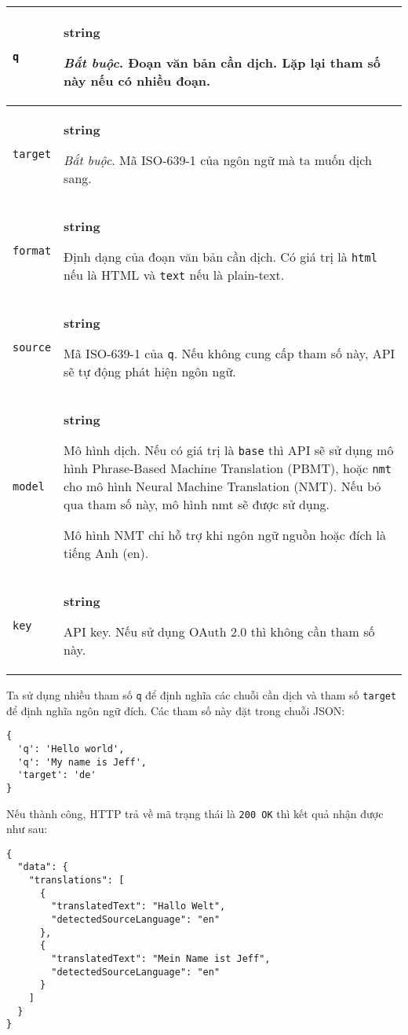 \documentclass[../thesis.tex]{subfiles}
\begin{document}
\begin{center}
\begin{tabularx}{\textwidth}{|p{}|X|}
\hline
\lstinline{q} & \textbf{string}

\textit{Bắt buộc}. Đoạn văn bản cần dịch. Lặp lại tham số này nếu có nhiều đoạn.\\
\hline
\lstinline{target} & \textbf{string}

\textit{Bắt buộc}. Mã ISO-639-1 của ngôn ngữ mà ta muốn dịch sang.\\
\hline
\lstinline{format} & \textbf{string}

Định dạng của đoạn văn bản cần dịch. Có giá trị là \lstinline{html} nếu là HTML và \lstinline{text} nếu là plain-text.\\
\hline
\lstinline{source} & \textbf{string}

Mã ISO-639-1 của \lstinline{q}. Nếu không cung cấp tham số này, API sẽ tự động phát hiện ngôn ngữ.\\
\hline
\lstinline{model} & \textbf{string}

Mô hình dịch. Nếu có giá trị là \lstinline{base} thì API sẽ sử dụng mô hình Phrase-Based Machine Translation (PBMT), hoặc \lstinline{nmt} cho mô hình Neural Machine Translation (NMT). Nếu bỏ qua tham số này, mô hình nmt sẽ được sử dụng.

Mô hình NMT chỉ hỗ trợ khi ngôn ngữ nguồn hoặc đích là tiếng Anh (en).\\
\hline
\lstinline{key} & \textbf{string}

API key. Nếu sử dụng OAuth 2.0 thì không cần tham số này.\\
\hline
\end{tabularx}
\end{center}

Ta sử dụng nhiều tham số \lstinline{q} để định nghĩa các chuỗi cần dịch và tham số \lstinline{target} để định nghĩa ngôn ngữ đích. Các tham số này đặt trong chuỗi JSON:

\begin{lstlisting}[numbers=none, frame=single,xleftmargin=0.15cm,xrightmargin=0.15cm]
{
  'q': 'Hello world',
  'q': 'My name is Jeff',
  'target': 'de'
}
\end{lstlisting}

Nếu thành công, HTTP trả về mã trạng thái là \lstinline{200 OK} thì kết quả nhận được như sau:

\begin{lstlisting}[numbers=none, frame=single,xleftmargin=0.15cm,xrightmargin=0.15cm]
{
  "data": {
    "translations": [
      {
        "translatedText": "Hallo Welt",
        "detectedSourceLanguage": "en"
      },
      {
        "translatedText": "Mein Name ist Jeff",
        "detectedSourceLanguage": "en"
      }
    ]
  }
} 
\end{lstlisting}
\end{document}
